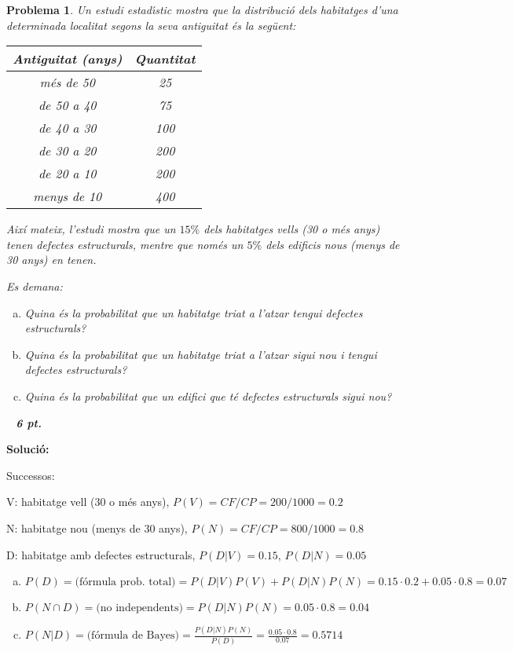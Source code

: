 \documentclass[a4paper,10pt]{article}
\newcounter{prbcont}
\newtheorem{problema}[prbcont]{Problema}
\begin{document}
\begin{problema}
Un estudi estad\'\i stic mostra que la distribuci\'o dels habitatges d'una determinada localitat segons la seva antiguitat 
\'es la seg\"uent:

\begin{center}
\begin{tabular}{|c|c|}
\hline
Antiguitat (anys) & Quantitat \\
\hline
m\'es de 50 & 25 \\
de 50 a 40 & 75 \\
de 40 a 30 & 100 \\
de 30 a 20 & 200 \\
de 20 a 10 & 200 \\
menys de 10 & 400 \\
\hline
\end{tabular}
\end{center}

Aix\'i mateix, l'estudi mostra que un $15\%$ dels habitatges \textit{vells}  (30 o m\'es anys)  tenen defectes estructurals, mentre 
que nom\'es un $5\%$ dels edificis \textit{nous}  (menys de 30 anys)  en tenen.

Es demana:
\begin{enumerate}[a)]
\item Quina \'es la probabilitat que un habitatge triat a l'atzar tengui defectes estructurals?
\item Quina \'es la probabilitat que un habitatge triat a l'atzar sigui \textit{nou} i tengui defectes estructurals?
\item Quina \'es la probabilitat que un edifici que té defectes estructurals sigui \textit{nou}?
\end{enumerate}

\ \hfill{\textbf{ 6 pt.}}
\end{problema}

\vspace{0.5cm}
\noindent
\textbf{Solució:}

Successos:

V: habitatge vell (30 o m\'es anys), $P(V)=CF/CP=200/1000=0.2$

N: habitatge nou (menys de 30 anys), $P(N)=CF/CP=800/1000=0.8$

D: habitatge amb defectes estructurals, $P(D|V)=0.15$, $P(D|N)=0.05$

\begin{enumerate}[a)]
\item $P(D)=\text{(f\'ormula prob. total)}=P(D|V)P(V)+P(D|N)P(N)=0.15\cdot 0.2 + 0.05 \cdot 0.8 = 0.07$
\item $P(N \cap D)=\text{(no independents)}=P(D|N)P(N)=0.05 \cdot 0.8= 0.04$
\item $P(N|D)=\text{(f\'ormula de Bayes)}=\displaystyle \frac{P(D|N)P(N)}{P(D)}=\frac{0.05 \cdot 0.8}{0.07}= 0.5714$
\end{enumerate}
\end{document}
